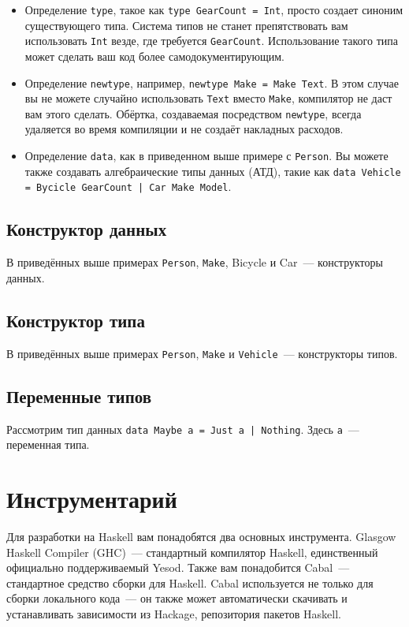 \begin{itemize}
  \item Определение \lstinline'type', такое как \lstinline'type GearCount = Int', просто создает синоним существующего типа. Система типов не станет препятствовать вам использовать \lstinline'Int' везде, где требуется \lstinline'GearCount'. Использование такого типа может сделать ваш код более самодокументирующим.
  \item Определение \lstinline'newtype', например, \lstinline'newtype Make = Make Text'. В этом случае вы не можете случайно использовать \lstinline'Text' вместо \lstinline'Make', компилятор не даст вам этого сделать. Обёртка, создаваемая посредством \lstinline'newtype', всегда удаляется во время компиляции и не создаёт накладных расходов.
  \item Определение \lstinline'data', как в приведенном выше примере с \lstinline'Person'. Вы можете также создавать алгебраические типы данных (АТД), такие как \lstinline'data Vehicle = Bycicle GearCount | Car Make Model'.
\end{itemize}

\subsection{Конструктор данных}

В приведённых выше примерах \lstinline'Person', \lstinline'Make', Bicycle и Car~--- конструкторы данных.

\subsection{Конструктор типа}

В приведённых выше примерах \lstinline'Person', \lstinline'Make' и \lstinline'Vehicle'~--- конструкторы типов.

\subsection{Переменные типов}

Рассмотрим тип данных \lstinline'data Maybe a = Just a | Nothing'. Здесь \lstinline'a'~--- переменная типа.

\section{Инструментарий}

Для разработки на Haskell вам понадобятся два основных инструмента. Glasgow Haskell Compiler (GHC)~--- стандартный компилятор Haskell, единственный официально поддерживаемый Yesod. Также вам понадобится Cabal~--- стандартное средство сборки для Haskell. Cabal используется не только для сборки локального кода~--- он также может автоматически скачивать и устанавливать зависимости из Hackage, репозитория пакетов Haskell.

